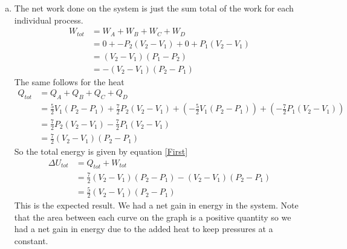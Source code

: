 \documentclass[11pt]{article}
\numberwithin{equation}{section}
\begin{document}
\begin{enumerate}[(a)]
\item
The net work done on the system is just the sum total of the work for each individual process.
\begin{align*}
W_{tot} &= W_A+W_B+W_C+W_D\\
&= 0 + -P_2(V_2-V_1) + 0 + P_1(V_2-V_1)\\
&= (V_2-V_1)(P_1-P_2)\\
&= -(V_2-V_1)(P_2-P_1)
\end{align*}
The same follows for the heat 
\begin{align*}
Q_{tot} &= Q_A+Q_B+Q_C+Q_D\\
&= \frac{5}{2}V_1(P_2-P_1) + \frac{7}{2}P_2(V_2 - V_1) + \left(-\frac{5}{2}V_1(P_2-P_1)\right) + \left(-\frac{7}{2}P_1(V_2-V_1)\right)\\
&=  \frac{7}{2}P_2(V_2 - V_1)  - \frac{7}{2}P_1(V_2-V_1)\\
&=  \frac{7}{2}(V_2 - V_1)(P_2-P_1)
\end{align*}
So the total energy is given by equation \ref{First}
\begin{align*}
\Delta U_{tot} &= Q_{tot} + W_{tot}\\
&= \frac{7}{2}(V_2 - V_1)(P_2-P_1) -(V_2-V_1)(P_2-P_1)\\
&= \frac{5}{2}(V_2 - V_1)(P_2-P_1)
\end{align*}
This is the expected result. We had a net gain in energy in the system. Note that the area between each curve on the graph is a positive quantity so we had a net gain in energy due to the added heat to keep pressures at a constant.
\end{enumerate}
\end{document}
